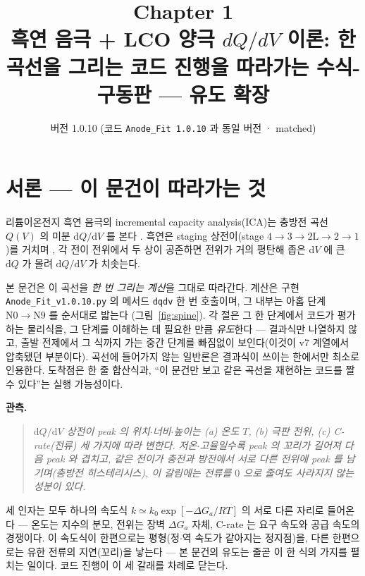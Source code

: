 \documentclass[11pt,a4paper]{article}
\title{\textbf{\LARGE Chapter 1}\\[0.35em]\Large 흑연 음극 + LCO 양극 $dQ/dV$ 이론: 한 곡선을 그리는 코드 진행을 따라가는 수식-구동판 — 유도 확장}
\author{}
\date{\normalsize 버전 1.0.10 \quad(코드 \texttt{Anode\_Fit 1.0.10} 과 동일 버전 · matched)}
\newcommand{\dd}{\mathrm{d}}
\newcommand{\code}[1]{\texttt{#1}}
\begin{document}
\maketitle

\section*{서론 — 이 문건이 따라가는 것}
리튬이온전지 흑연 음극의 incremental capacity analysis(ICA)는 충방전 곡선 $Q(V)$ 의 미분
$\dd Q/\dd V$ 를 본다 \cite{bloom2005,dubarry2012}. 흑연은 staging 상전이(stage
$4\!\to\!3\!\to\!2\mathrm L\!\to\!2\!\to\!1$)를 거치며 \cite{dahn1991,ohzuku1993}, 각 전이 전위에서
두 상이 공존하면 전위가 거의 평탄해 좁은 $\dd V$ 에 큰 $\dd Q$ 가 몰려 $\dd Q/\dd V$ 가 치솟는다.

본 문건은 이 곡선을 \emph{한 번 그리는 계산}을 그대로 따라간다. 계산은 구현 \code{Anode\_Fit\_v1.0.10.py}
의 메서드 \code{dqdv} 한 번 호출이며, 그 내부는 아홉 단계 $\mathrm N0\!\to\!\mathrm N9$ 를 순서대로 밟는다
(그림~\ref{fig:spine}). 각 절은 그 한 단계에서 코드가 평가하는 물리식을, 그 단계를 이해하는 데 필요한 만큼
\emph{유도}한다 — 결과식만 나열하지 않고, 출발 전제에서 그 식까지 가는 중간 단계를 빠짐없이 보인다(이것이 v7
계열에서 압축됐던 부분이다). 곡선에 들어가지 않는 일반론은 결과식이 쓰이는 한에서만 최소로 인용한다. 도착점은 한 줄
합산식과, ``이 문건만 보고 같은 곡선을 재현하는 코드를 짤 수 있다''는 실행 가능성이다.

\textbf{관측.}
\begin{quote}\itshape
$\dd Q/\dd V$ 상전이 peak 의 위치$\cdot$너비$\cdot$높이는 (a) 온도 $T$, (b) 극판 전위, (c) C-rate(전류)
세 가지에 따라 변한다. 저온$\cdot$고율일수록 peak 의 꼬리가 길어져 다음 peak 와 겹치고, 같은 전이가 충전과 방전에서
서로 다른 전위에 peak 를 남기며(충방전 히스테리시스), 이 갈림에는 전류를 $0$ 으로 줄여도 사라지지 않는 성분이 있다.
\end{quote}

세 인자는 모두 하나의 속도식 $k\simeq k_0\exp[-\Delta G_a/RT]$ 의 서로 다른 자리로 들어온다 — 온도는 지수의 분모,
전위는 장벽 $\Delta G_a$ 자체, C-rate 는 요구 속도와 공급 속도의 경쟁이다. 이 속도식이 한편으로는 평형(정$\cdot$역
속도가 같아지는 정지점)을, 다른 한편으로는 유한 전류의 지연(꼬리)을 낳는다 — 본 문건의 유도는 줄곧 이 한 식의 가지를
펼치는 일이다. 코드 진행이 이 세 갈래를 차례로 닫는다.
\end{document}
